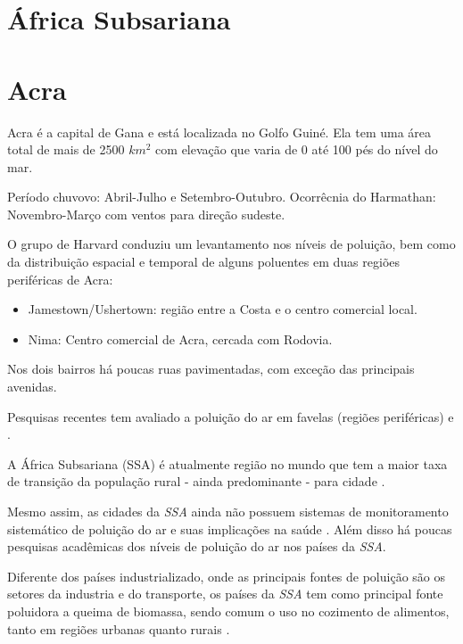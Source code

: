 \section{África Subsariana}

\section{Acra}

Acra é a capital  de Gana e está localizada no Golfo Guiné. Ela tem uma área 
total de mais de 2500 $km^2$ com elevação que varia de 0 até 100 pés do nível 
do mar. 

Período chuvovo: Abril-Julho e Setembro-Outubro. 
Ocorrêcnia do Harmathan: Novembro-Março com ventos para direção sudeste.

O grupo de Harvard \citep{ARKU2008} conduziu um levantamento nos níveis de 
poluição, bem como da distribuição espacial e temporal de alguns poluentes 
em duas regiões periféricas de Acra: 
\citep{DIONISIO2010}

\begin{itemize}
  \item Jamestown/Ushertown: região entre a Costa e o centro comercial local.
  \item Nima: Centro comercial de Acra, cercada com Rodovia.
\end{itemize} 

Nos dois bairros há poucas ruas pavimentadas, com exceção das principais 
avenidas. 

Pesquisas recentes tem avaliado a poluição do ar em favelas 
(regiões periféricas) \citep{SCLAR2005} e \citep{RILEY2007}. 

A África Subsariana (SSA) é atualmente região no mundo que tem a maior taxa de 
transição da população rural - ainda predominante - para cidade 
\citep{MONTGOMERY2008}.

Mesmo assim, as cidades da \textit{SSA} ainda não possuem sistemas de 
monitoramento sistemático de poluição do ar e suas implicações na saúde 
\citep{EZZATI2004}. 
Além disso há poucas pesquisas acadêmicas dos níveis de poluição do ar nos 
países da \textit{SSA}.

Diferente dos países industrializado, onde as principais fontes de poluição 
são os setores da industria e do transporte, os países da \textit{SSA} tem como 
principal fonte poluidora a queima de biomassa, sendo comum o uso no cozimento 
de alimentos, tanto em regiões urbanas quanto rurais \citep{SMITH2004}.
